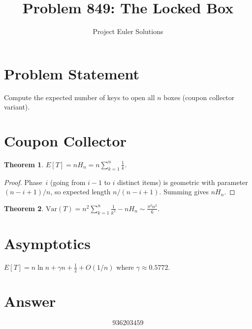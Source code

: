 \documentclass[11pt]{article}
\title{Problem 849: The Locked Box}
\author{Project Euler Solutions}
\date{}
\newtheorem{theorem}{Theorem}
\begin{document}
\maketitle

\section{Problem Statement}
Compute the expected number of keys to open all $n$ boxes (coupon collector variant).

\section{Coupon Collector}

\begin{theorem}
$E[T] = n H_n = n\sum_{k=1}^{n} \frac{1}{k}$.
\end{theorem}

\begin{proof}
Phase~$i$ (going from $i{-}1$ to $i$ distinct items) is geometric with parameter $(n-i+1)/n$, so expected length $n/(n-i+1)$. Summing gives $nH_n$.
\end{proof}

\begin{theorem}
$\mathrm{Var}(T) = n^2 \sum_{k=1}^n \frac{1}{k^2} - nH_n \sim \frac{\pi^2 n^2}{6}$.
\end{theorem}

\section{Asymptotics}
$E[T] = n\ln n + \gamma n + \frac{1}{2} + O(1/n)$ where $\gamma \approx 0.5772$.

\section{Answer}

\[
\boxed{936203459}
\]
\end{document}
